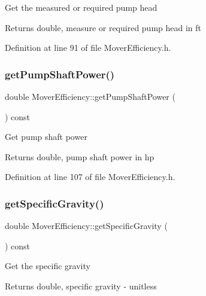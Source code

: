 Get the measured or required pump head \begin{DoxyReturn}{Returns}
double, measure or required pump head in ft 
\end{DoxyReturn}


Definition at line 91 of file Mover\+Efficiency.\+h.

\mbox{\label{class_mover_efficiency_a367c3cb3a070cef9de5e3ca87bbf62fe}} 
\subsubsection{\texorpdfstring{get\+Pump\+Shaft\+Power()}{getPumpShaftPower()}}
{\footnotesize\ttfamily double Mover\+Efficiency\+::get\+Pump\+Shaft\+Power (\begin{DoxyParamCaption}{ }\end{DoxyParamCaption}) const\hspace{0.3cm}{\ttfamily [inline]}}

Get pump shaft power \begin{DoxyReturn}{Returns}
double, pump shaft power in hp 
\end{DoxyReturn}


Definition at line 107 of file Mover\+Efficiency.\+h.

\mbox{\label{class_mover_efficiency_a4acdd89fec01daef4902238202e00884}} 
\subsubsection{\texorpdfstring{get\+Specific\+Gravity()}{getSpecificGravity()}}
{\footnotesize\ttfamily double Mover\+Efficiency\+::get\+Specific\+Gravity (\begin{DoxyParamCaption}{ }\end{DoxyParamCaption}) const\hspace{0.3cm}{\ttfamily [inline]}}

Get the specific gravity \begin{DoxyReturn}{Returns}
double, specific gravity -\/ unitless 
\end{DoxyReturn}



